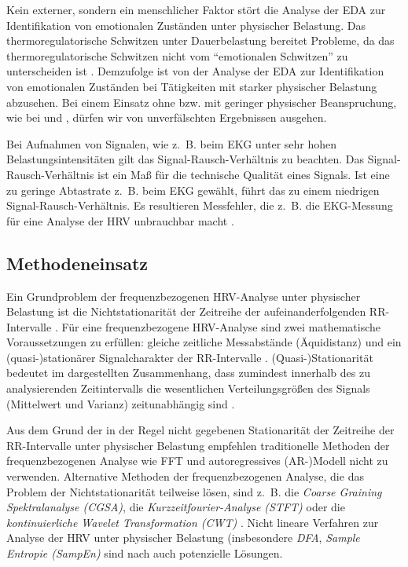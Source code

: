 Kein externer, sondern ein menschlicher Faktor stört die Analyse der \ac{EDA} zur Identifikation von emotionalen Zuständen unter physischer Belastung. Das thermoregulatorische Schwitzen unter Dauerbelastung bereitet Probleme, da das thermoregulatorische Schwitzen nicht vom "`emotionalen Schwitzen"' zu unterscheiden ist \citep[vgl.][]{Baumeister2008}. Demzufolge ist von der Analyse der \ac{EDA} zur Identifikation von emotionalen Zuständen bei Tätigkeiten mit starker physischer Belastung abzusehen. Bei einem Einsatz ohne bzw. mit geringer physischer Beanspruchung, wie bei \citet{Kivikangas2006} und \citet{Nacke2008}, dürfen wir von unverfälschten Ergebnissen ausgehen.

Bei Aufnahmen von Signalen, wie z.~B. beim \ac{EKG} unter sehr hohen Belastungsintensitäten gilt das Signal-Rausch-Verhältnis zu beachten. Das Signal-Rausch-Verhältnis ist ein Maß für die technische Qualität eines Signals. Ist eine zu geringe Abtastrate z.~B. beim \ac{EKG} gewählt, führt das zu einem niedrigen Signal-Rausch-Verhältnis. Es resultieren Messfehler, die z.~B. die \ac{EKG}-Messung für eine Analyse der \ac{HRV} unbrauchbar macht \citep[vgl.][]{Hoos2010}.

\subsection{Methodeneinsatz}
Ein Grundproblem der frequenzbezogenen \ac{HRV}-Analyse unter physischer Belastung ist die Nichtstationarität der Zeitreihe der aufeinanderfolgenden RR-Intervalle \citep[vgl.][]{Hottenrott2006}. Für eine frequenzbezogene \ac{HRV}-Analyse sind zwei mathematische Voraussetzungen zu erfüllen: gleiche zeitliche Messabstände (Äquidistanz) und ein (quasi-)stationärer Signalcharakter der RR-Intervalle \citep[vgl.][]{Hoos2006}. (Quasi-)Stationarität bedeutet im dargestellten Zusammenhang, dass zumindest innerhalb des zu analysierenden Zeitintervalls die wesentlichen Verteilungsgrößen des Signals (Mittelwert und Varianz) zeitunabhängig sind \citep[vgl.][]{Hoos2006}.

Aus dem Grund der in der Regel nicht gegebenen Stationarität der Zeitreihe der RR-Intervalle unter physischer Belastung empfehlen \citet[S.~113]{Sarmiento2013} traditionelle Methoden der frequenzbezogenen Analyse wie \acs{FFT} und autoregressives (AR-)Modell nicht zu verwenden. Alternative Methoden der frequenzbezogenen Analyse, die das Problem der Nichtstationarität teilweise lösen, sind z.~B. die \emph{Coarse Graining Spektralanalyse (CGSA)}, die \emph{Kurzzeitfourier-Analyse (STFT)} oder die \emph{kontinuierliche Wavelet Transformation (CWT)} \citep[vgl.][S.~61f.]{Hoos2010}. Nicht lineare Verfahren zur Analyse der \ac{HRV} unter physischer Belastung (insbesondere \emph{\ac{DFA}}, \emph{Sample Entropie (SampEn)} sind nach \citet[vgl.][S.~61f.]{Hoos2010} auch potenzielle Lösungen.

